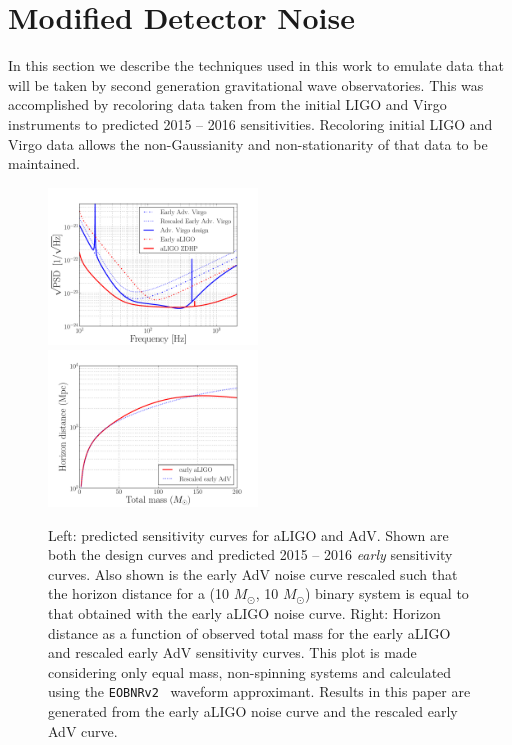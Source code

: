 \documentclass[12pt]{iopart}
\newcommand{\eob}{\texttt{EOBNRv2}\xspace}
\begin{document}
\section{Modified Detector Noise}
\label{sec:noise}

In this section we describe the techniques used in this work to emulate data 
that will be taken by second generation gravitational wave observatories. This 
was accomplished by recoloring data taken from the initial LIGO and Virgo 
instruments to predicted 2015 -- 2016 sensitivities. Recoloring initial LIGO 
and 
Virgo data allows the non-Gaussianity and non-stationarity of that data to be 
maintained.

\begin{figure}
\centering
\includegraphics[width=0.495\textwidth]
{figure2A}
\includegraphics[width=0.495\textwidth]
{figure2B}
\caption{\label{fig:NOISE_design_spectra}
Left: predicted sensitivity curves for aLIGO and
AdV. Shown are both the design curves and predicted 2015 -- 2016
\emph{early} sensitivity curves. Also shown is the early AdV noise curve 
rescaled such that the horizon distance for a (10 $M_{\odot}$, 10 $M_{\odot}$) 
binary system is equal to that obtained with the early aLIGO noise 
curve. Right: Horizon distance as a function of observed total mass for the 
early aLIGO and rescaled early AdV sensitivity curves. This plot is 
made considering only equal mass, non-spinning systems and calculated using the 
\eob ~\cite{Pan:2011gk} waveform approximant. Results in this paper are 
generated from the early aLIGO noise curve and the rescaled early AdV curve.}
\end{figure}
\end{document}
